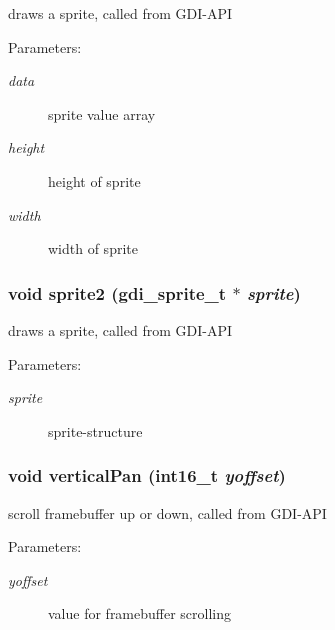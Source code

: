 draws a sprite, called from GDI-API 

\begin{Desc}
\item[Parameters:]
\begin{description}
\item[{\em data}]sprite value array \item[{\em height}]height of sprite \item[{\em width}]width of sprite \end{description}
\end{Desc}
\hypertarget{group__graphic__device_gaea2e351a7efbc2ec4be0f4688593fdb}{
\subsubsection[{sprite2}]{\setlength{\rightskip}{0pt plus 5cm}void sprite2 ({\bf gdi\_\-sprite\_\-t} $\ast$ {\em sprite})}}
\label{group__graphic__device_gaea2e351a7efbc2ec4be0f4688593fdb}


draws a sprite, called from GDI-API 

\begin{Desc}
\item[Parameters:]
\begin{description}
\item[{\em sprite}]sprite-structure \end{description}
\end{Desc}
\hypertarget{group__graphic__device_g3a3cd779058c4bb5b8b03e316f58ed16}{
\subsubsection[{verticalPan}]{\setlength{\rightskip}{0pt plus 5cm}void verticalPan (int16\_\-t {\em yoffset})}}
\label{group__graphic__device_g3a3cd779058c4bb5b8b03e316f58ed16}


scroll framebuffer up or down, called from GDI-API 

\begin{Desc}
\item[Parameters:]
\begin{description}
\item[{\em yoffset}]value for framebuffer scrolling \end{description}
\end{Desc}
